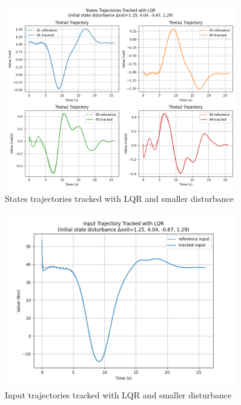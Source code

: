 \documentclass[a4paper,11pt,oneside]{book}
\begin{document}
\begin{figure}[H]
    \centering
    \includegraphics[width=0.9\textwidth]{States_Trajectories_Tracked_with_LQR_dist1_T3.png}
    \caption{States trajectories tracked with LQR and smaller disturbance}
    \label{fig:enter-label}
\end{figure}
\begin{figure}[H]
    \centering
    \includegraphics[width=0.9\textwidth]{Input_Trajectory_Tracked_with_LQR_dist1(I)_T3.png}
    \caption{Input trajectories tracked with LQR and smaller disturbance}
    \label{fig:enter-label}
\end{figure}
\end{document}
